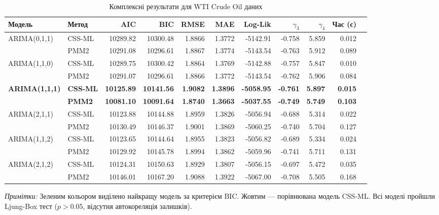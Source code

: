 \documentclass[12pt,a4paper]{article}
\begin{document}
\begin{table}[htbp]
\centering
\footnotesize
\caption{Комплексні результати для WTI Crude Oil даних}
\label{tab:wti_comprehensive_results}
\begin{tabular}{@{}llrrrrrrrrr@{}}
\toprule
\textbf{Модель} & \textbf{Метод} & \textbf{AIC} & \textbf{BIC} & \textbf{RMSE} & \textbf{MAE} & \textbf{Log-Lik} & $\gamma_3$ & $\gamma_4$ & \textbf{Час (с)} \\
\midrule
ARIMA(0,1,1) & CSS-ML & 10289.82 & 10300.48 & 1.8866 & 1.3772 & -5142.91 & -0.758 & 5.859 & 0.012 \\
             & PMM2   & 10291.08 & 10296.61 & 1.8867 & 1.3774 & -5143.54 & -0.763 & 5.912 & 0.089 \\
\midrule
ARIMA(1,1,0) & CSS-ML & 10289.75 & 10300.42 & 1.8864 & 1.3769 & -5142.88 & -0.757 & 5.847 & 0.010 \\
             & PMM2   & 10291.07 & 10296.61 & 1.8866 & 1.3772 & -5143.54 & -0.762 & 5.906 & 0.084 \\
\midrule
\rowcolor{yellow!20}
\textbf{ARIMA(1,1,1)} & \textbf{CSS-ML} & \textbf{10125.89} & \textbf{10141.56} & \textbf{1.9082} & \textbf{1.3896} & \textbf{-5058.95} & \textbf{-0.761} & \textbf{5.897} & \textbf{0.015} \\
\rowcolor{green!20}
             & \textbf{PMM2}   & \textbf{10081.10} & \textbf{10091.64} & \textbf{1.8740} & \textbf{1.3663} & \textbf{-5037.55} & \textbf{-0.749} & \textbf{5.749} & \textbf{0.103} \\
\midrule
ARIMA(2,1,1) & CSS-ML & 10123.88 & 10144.88 & 1.8959 & 1.3826 & -5056.94 & -0.688 & 5.314 & 0.022 \\
             & PMM2   & 10130.49 & 10146.37 & 1.9001 & 1.3869 & -5060.25 & -0.740 & 5.704 & 0.127 \\
\midrule
ARIMA(1,1,2) & CSS-ML & 10123.65 & 10144.64 & 1.8955 & 1.3823 & -5056.82 & -0.689 & 5.334 & 0.024 \\
             & PMM2   & 10129.92 & 10145.78 & 1.8994 & 1.3862 & -5059.96 & -0.741 & 5.711 & 0.131 \\
\midrule
ARIMA(2,1,2) & CSS-ML & 10124.31 & 10150.63 & 1.8929 & 1.3807 & -5056.15 & -0.697 & 5.472 & 0.035 \\
             & PMM2   & 10146.01 & 10167.20 & 1.9088 & 1.3922 & -5067.00 & -0.708 & 5.505 & 0.168 \\
\bottomrule
\end{tabular}
\end{table}

\noindent\textit{Примітки:} Зеленим кольором виділено найкращу модель за критерієм BIC. Жовтим --- порівнювана модель CSS-ML. Всі моделі пройшли Ljung-Box тест ($p > 0.05$, відсутня автокореляція залишків).
\end{document}
